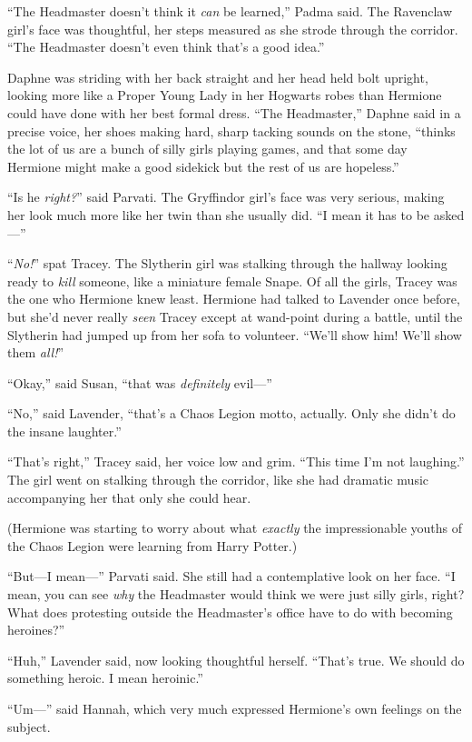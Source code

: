 “The Headmaster doesn’t think it \emph{can} be learned,” Padma said. The Ravenclaw girl’s face was thoughtful, her steps measured as she strode through the corridor. “The Headmaster doesn’t even think that’s a good idea.”

Daphne was striding with her back straight and her head held bolt upright, looking more like a Proper Young Lady in her Hogwarts robes than Hermione could have done with her best formal dress. “The Headmaster,” Daphne said in a precise voice, her shoes making hard, sharp tacking sounds on the stone, “thinks the lot of us are a bunch of silly girls playing games, and that some day Hermione might make a good sidekick but the rest of us are hopeless.”

“Is he \emph{right?}” said Parvati. The Gryffindor girl’s face was very serious, making her look much more like her twin than she usually did. “I mean it has to be asked—”

“\emph{No!}” spat Tracey. The Slytherin girl was stalking through the hallway looking ready to \emph{kill} someone, like a miniature female Snape. Of all the girls, Tracey was the one who Hermione knew least. Hermione had talked to Lavender once before, but she’d never really \emph{seen} Tracey except at wand-point during a battle, until the Slytherin had jumped up from her sofa to volunteer. “We’ll show him! We’ll show them \emph{all!}”

“Okay,” said Susan, “that was \emph{definitely} evil—”

“No,” said Lavender, “that’s a Chaos Legion motto, actually. Only she didn’t do the insane laughter.”

“That’s right,” Tracey said, her voice low and grim. “This time I’m not laughing.” The girl went on stalking through the corridor, like she had dramatic music accompanying her that only she could hear.

(Hermione was starting to worry about what \emph{exactly} the impressionable youths of the Chaos Legion were learning from Harry Potter.)

“But—I mean—” Parvati said. She still had a contemplative look on her face. “I mean, you can see \emph{why} the Headmaster would think we were just silly girls, right? What does protesting outside the Headmaster’s office have to do with becoming heroines?”

“Huh,” Lavender said, now looking thoughtful herself. “That’s true. We should do something heroic. I mean heroinic.”

“Um—” said Hannah, which very much expressed Hermione’s own feelings on the subject.


